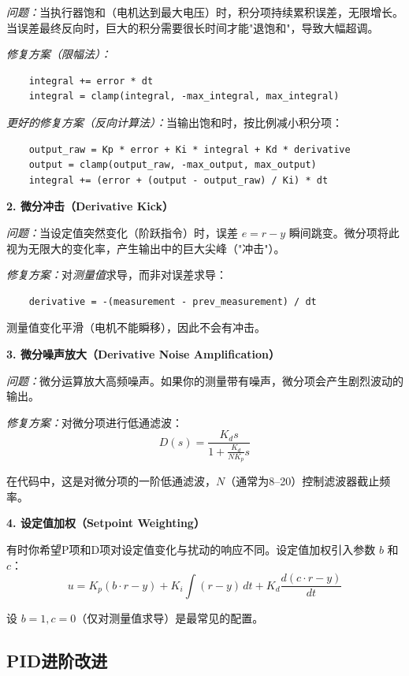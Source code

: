 \textit{问题：}当执行器饱和（电机达到最大电压）时，积分项持续累积误差，无限增长。当误差最终反向时，巨大的积分需要很长时间才能"退饱和"，导致大幅超调。

\textit{修复方案（限幅法）：}
\begin{verbatim}
    integral += error * dt
    integral = clamp(integral, -max_integral, max_integral)
\end{verbatim}

\textit{更好的修复方案（反向计算法）：}当输出饱和时，按比例减小积分项：
\begin{verbatim}
    output_raw = Kp * error + Ki * integral + Kd * derivative
    output = clamp(output_raw, -max_output, max_output)
    integral += (error + (output - output_raw) / Ki) * dt
\end{verbatim}

\textbf{2. 微分冲击（Derivative Kick）}

\textit{问题：}当设定值突然变化（阶跃指令）时，误差 $e = r - y$ 瞬间跳变。微分项将此视为无限大的变化率，产生输出中的巨大尖峰（"冲击"）。

\textit{修复方案：}对\textit{测量值}求导，而非对误差求导：
\begin{verbatim}
    derivative = -(measurement - prev_measurement) / dt
\end{verbatim}

测量值变化平滑（电机不能瞬移），因此不会有冲击。

\textbf{3. 微分噪声放大（Derivative Noise Amplification）}

\textit{问题：}微分运算放大高频噪声。如果你的测量带有噪声，微分项会产生剧烈波动的输出。

\textit{修复方案：}对微分项进行低通滤波：
\begin{equation}
D(s) = \frac{K_d s}{1 + \frac{K_d}{N K_p} s}
\end{equation}

在代码中，这是对微分项的一阶低通滤波，$N$（通常为8--20）控制滤波器截止频率。

\textbf{4. 设定值加权（Setpoint Weighting）}

有时你希望P项和D项对设定值变化与扰动的响应不同。设定值加权引入参数 $b$ 和 $c$：
\begin{equation}
u = K_p(b \cdot r - y) + K_i \int (r - y) \, dt + K_d \frac{d(c \cdot r - y)}{dt}
\end{equation}

设 $b = 1, c = 0$（仅对测量值求导）是最常见的配置。

\subsection{PID进阶改进}

